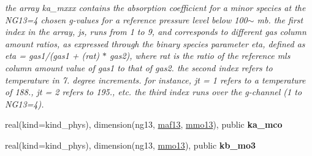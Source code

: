 \begin{Indent}
\begin{DoxyCompactItemize}
\begin{DoxyCompactList}\small\item\em the array ka\+\_\+mxxx contains the absorption coefficient for a minor species at the N\+G13=4 chosen g-\/values for a reference pressure level below 100$\sim$ mb. the first index in the array, js, runs from 1 to 9, and corresponds to different gas column amount ratios, as expressed through the binary species parameter eta, defined as eta = gas1/(gas1 + (rat) $\ast$ gas2), where rat is the ratio of the reference mls column amount value of gas1 to that of gas2. the second index refers to temperature in 7. degree increments. for instance, jt = 1 refers to a temperature of 188., jt = 2 refers to 195., etc. the third index runs over the g-\/channel (1 to N\+G13=4). \end{DoxyCompactList}\item 
real(kind=kind\+\_\+phys), dimension(ng13, \hyperlink{group__module__radlw__kgbnn_ga1ddc025df872b12194b8c6344cc0204e}{maf13}, \hyperlink{group__module__radlw__kgbnn_gae513ce55829a57a0dbda77f570e4a619}{mmo13}), public {\bfseries ka\+\_\+mco}
\item 
real(kind=kind\+\_\+phys), dimension(ng13, \hyperlink{group__module__radlw__kgbnn_gae513ce55829a57a0dbda77f570e4a619}{mmo13}), public {\bfseries kb\+\_\+mo3}
\end{DoxyCompactItemize}
\end{Indent}
